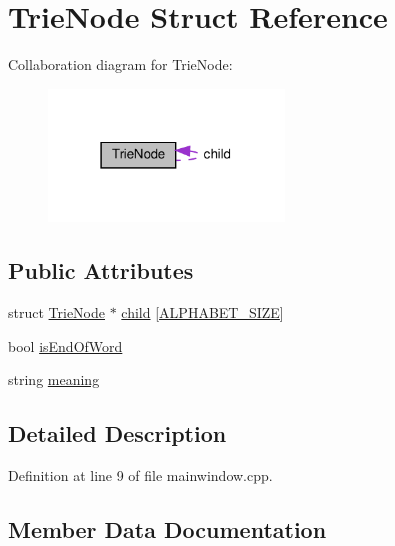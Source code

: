 \hypertarget{struct_trie_node}{}\section{Trie\+Node Struct Reference}
\label{struct_trie_node}


Collaboration diagram for Trie\+Node\+:
\nopagebreak
\begin{figure}[H]
\begin{center}
\leavevmode
\includegraphics[width=178pt]{struct_trie_node__coll__graph}
\end{center}
\end{figure}
\subsection*{Public Attributes}
\begin{DoxyCompactItemize}
\item 
struct \hyperlink{struct_trie_node}{Trie\+Node} $\ast$ \hyperlink{struct_trie_node_a3ec9fb81441dc5f30960242580869b80}{child} \mbox{[}\hyperlink{mainwindow_8cpp_afb525552ed6d204d5636ad18ccf5355f}{A\+L\+P\+H\+A\+B\+E\+T\+\_\+\+S\+I\+ZE}\mbox{]}
\item 
bool \hyperlink{struct_trie_node_ab2732ce1e141346865d997859836d663}{is\+End\+Of\+Word}
\item 
string \hyperlink{struct_trie_node_a74b66d86de58c281d357f24e736ad953}{meaning}
\end{DoxyCompactItemize}


\subsection{Detailed Description}


Definition at line 9 of file mainwindow.\+cpp.



\subsection{Member Data Documentation}
\mbox{\label{struct_trie_node_a3ec9fb81441dc5f30960242580869b80}} 
